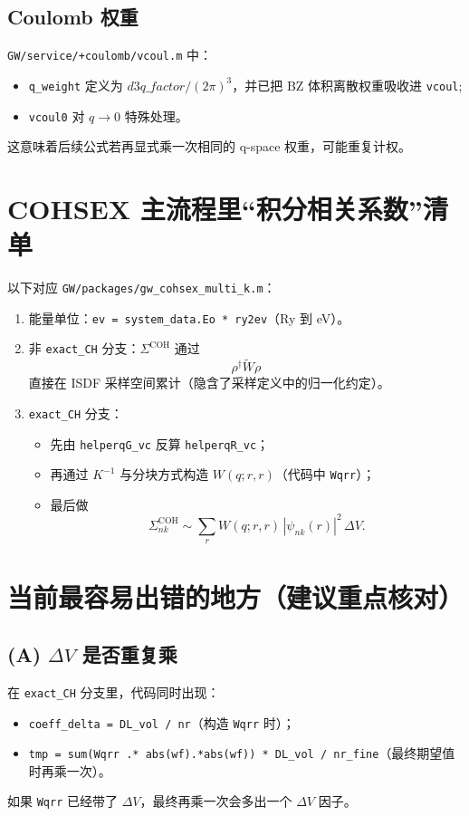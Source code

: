 \documentclass[11pt]{article}
\begin{document}
\subsection{Coulomb 权重}
\texttt{GW/service/+coulomb/vcoul.m} 中：
\begin{itemize}
  \item \texttt{q\_weight} 定义为 $d3q\_factor/(2\pi)^3$，并已把 BZ 体积离散权重吸收进 \texttt{vcoul};
  \item \texttt{vcoul0} 对 $q\to0$ 特殊处理。
\end{itemize}
这意味着后续公式若再显式乘一次相同的 q-space 权重，可能重复计权。

\section{COHSEX 主流程里“积分相关系数”清单}
以下对应 \texttt{GW/packages/gw\_cohsex\_multi\_k.m}：
\begin{enumerate}
  \item 能量单位：\texttt{ev = system\_data.Eo * ry2ev}（Ry 到 eV）。
  \item 非 \texttt{exact\_CH} 分支：$\Sigma^{\mathrm{COH}}$ 通过
  \[
  \rho^\dagger \tilde W \rho
  \]
  直接在 ISDF 采样空间累计（隐含了采样定义中的归一化约定）。
  \item \texttt{exact\_CH} 分支：
  \begin{itemize}
    \item 先由 \texttt{helperqG\_vc} 反算 \texttt{helperqR\_vc}；
    \item 再通过 $K^{-1}$ 与分块方式构造 $W(q;r,r)$（代码中 \texttt{Wqrr}）；
    \item 最后做
    \[
    \Sigma^{\mathrm{COH}}_{nk}
    \sim
    \sum_r W(q;r,r)\,|\psi_{nk}(r)|^2 \,\Delta V.
    \]
  \end{itemize}
\end{enumerate}

\section{当前最容易出错的地方（建议重点核对）}
\subsection{(A) $\Delta V$ 是否重复乘}
在 \texttt{exact\_CH} 分支里，代码同时出现：
\begin{itemize}
  \item \texttt{coeff\_delta = DL\_vol / nr}（构造 \texttt{Wqrr} 时）；
  \item \texttt{tmp = sum(Wqrr .* abs(wf).*\!abs(wf)) * DL\_vol / nr\_fine}（最终期望值时再乘一次）。
\end{itemize}
如果 \texttt{Wqrr} 已经带了 $\Delta V$，最终再乘一次会多出一个 $\Delta V$ 因子。
\end{document}
